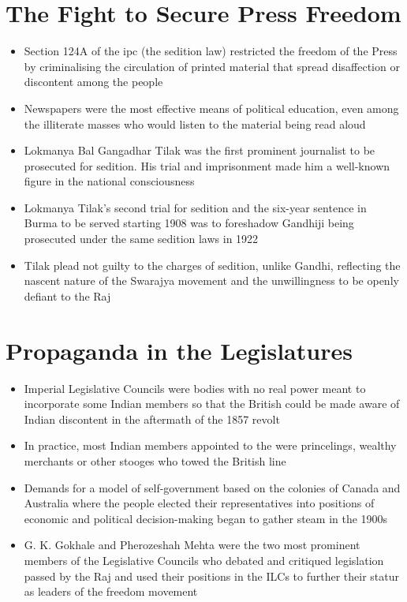 \section{The Fight to Secure Press Freedom}
\begin{itemize}
    \item Section 124A of the \acrshort{ipc} (the sedition law) restricted the freedom of the Press by criminalising the circulation of printed material that spread disaffection or discontent among the people
    \item Newspapers were the most effective means of political education, even among the illiterate masses who would listen to the material being read aloud
    \item Lokmanya Bal Gangadhar Tilak was the first prominent journalist to be prosecuted for sedition. His trial and imprisonment made him a well-known figure in the national consciousness
    \item Lokmanya Tilak's second trial for sedition and the six-year sentence in Burma to be served starting 1908 was to foreshadow Gandhiji being prosecuted under the same sedition laws in 1922
    \item Tilak plead not guilty to the charges of sedition, unlike Gandhi, reflecting the nascent nature of the Swarajya movement and the unwillingness to be openly defiant to the Raj
\end{itemize}

\section{Propaganda in the Legislatures}
\begin{itemize}
    \item Imperial Legislative Councils were bodies with no real power meant to incorporate some Indian members so that the British could be made aware of Indian discontent in the aftermath of the 1857 revolt
    \item In practice, most Indian members appointed to the  were princelings, wealthy merchants or other stooges who towed the British line
    \item Demands for a model of self-government based on the colonies of Canada and Australia where the people elected their representatives into positions of economic and political decision-making began to gather steam in the 1900s
    \item G. K. Gokhale and Pherozeshah Mehta were the two most prominent members of the Legislative Councils who debated and critiqued legislation passed by the Raj and used their positions in the ILCs to further their statur as leaders of the freedom movement
\end{itemize}

